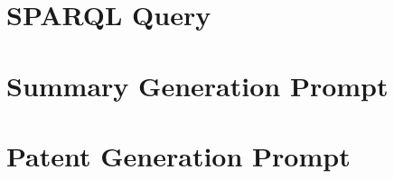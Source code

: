 \FloatBarrier


\renewcommand{\sparqlbasicstyle}{\tiny\tt}
\begin{figure}
  \section{SPARQL Query}\label{sec:sparql_appendix}
  \begin{minipage}{\textwidth}
  \centering
  
\end{minipage}
\end{figure}
\renewcommand{\sparqlbasicstyle}{\small\tt}


\FloatBarrier


\renewcommand{\sparqlbasicstyle}{\tiny\tt}
\begin{figure}
  \section{Summary Generation Prompt}\label{sec:summary_prompt_appendix}
  \begin{minipage}{\textwidth}
  \centering
  
\end{minipage}
\end{figure}
\renewcommand{\sparqlbasicstyle}{\small\tt}

\FloatBarrier


\renewcommand{\sparqlbasicstyle}{\tiny\tt}
\begin{figure}
  \section{Patent Generation Prompt}\label{sec:generation_prompt_appendix}
  \begin{minipage}{\textwidth}
  \centering
  
\end{minipage}
\end{figure}

\FloatBarrier


\begin{figure}
\begin{minipage}{\textwidth}
  \centering
  
\end{minipage}
\end{figure}

